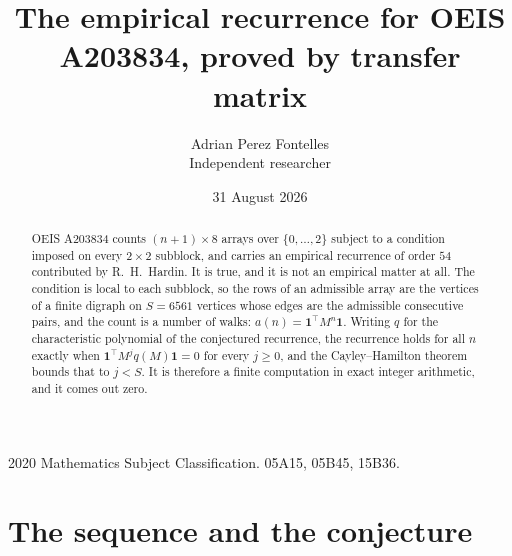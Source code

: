 \documentclass[11pt,a4paper]{article}
\title{The empirical recurrence for OEIS A203834, proved by transfer matrix}
\author{Adrian Perez Fontelles\\ \small Independent researcher}
\date{31 August 2026}
\theoremstyle{plain}
\theoremstyle{definition}
\begin{document}
\maketitle

\begin{abstract}
OEIS A203834 counts $(n+1)\times8$ arrays over $\{0,\dots,2\}$ subject to a condition imposed on
every $2\times2$ subblock, and carries an empirical recurrence of order $54$ contributed
by R.~H.~Hardin. It is true, and it is not an empirical matter at all. The condition is local
to each subblock, so the rows of an admissible array are the vertices of a finite digraph
on $S=6561$ vertices whose edges are the admissible consecutive pairs, and the count is a
number of walks: $a(n)=\mathbf{1}^{\!\top}M^{n}\mathbf{1}$. Writing $q$
for the characteristic polynomial of the conjectured recurrence, the recurrence holds for all
$n$ exactly when $\mathbf{1}^{\!\top}M^{j}q(M)\mathbf{1}=0$ for every $j\ge0$, and the
Cayley--Hamilton theorem bounds that to $j<S$. It is therefore a finite computation in exact
integer arithmetic, and it comes out zero.
\end{abstract}

\noindent\small 2020 Mathematics Subject Classification. 05A15, 05B45, 15B36.\normalsize

\section{The sequence and the conjecture}
\end{document}
